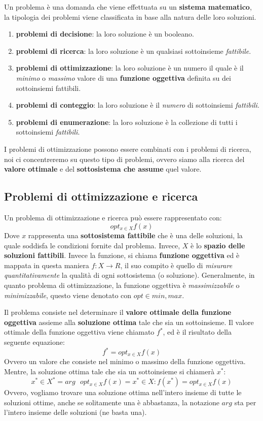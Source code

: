 \documentclass{article}
\begin{document}
Un problema è una domanda che viene effettuata su un \textbf{sistema matematico}, la tipologia dei problemi viene classificata in base alla natura delle loro soluzioni.
\begin{enumerate}
    \item \textbf{problemi di decisione}: la loro soluzione è un booleano.
    \item \textbf{problemi di ricerca}: la loro soluzione è un qualsiasi sottoinsieme \textit{fattibile}.
    \item \textbf{problemi di ottimizzazione}: la loro soluzione è un numero il quale è il \textit{minimo} o \textit{massimo} valore di una \textbf{funzione oggettiva}
          definita su dei sottoinsiemi fattibili.
    \item \textbf{problemi di conteggio}: la loro soluzione è il \textit{numero} di sottoinsiemi \textit{fattibili}.
    \item \textbf{problemi di enumerazione}: la loro soluzione è la collezione di tutti i sottoinsiemi \textit{fattibili}.
\end{enumerate}
I problemi di ottimizzazione possono essere combinati con i problemi di ricerca, noi ci concentreremo su questo tipo di problemi, ovvero siamo alla ricerca del
\textbf{valore ottimale} e del \textbf{sottosistema che assume} quel valore.

\subsection{Problemi di ottimizzazione e ricerca}

Un problema di ottimizzazione e ricerca può essere rappresentato con:
$$opt_{x\in X}f(x)$$
Dove $x$ rappresenta una \textbf{sottosistema fattibile} che è una delle soluzioni, la quale soddisfa le condizioni fornite dal problema. Invece, $X$
è lo \textbf{spazio delle soluzioni fattibili}. Invece la funzione, si chiama \textbf{funzione oggettiva} ed è mappata in questa maniera $f:X \rightarrow R$,
il suo compito è quello di \textit{misurare quantitativamente} la qualità di ogni sottosistema (o soluzione).
Generalmente, in quanto problema di ottimizzazione, la funzione oggettiva è \textit{massimizzabile} o \textit{minimizzabile}, questo viene denotato con $opt\in {min,max}$.

Il problema consiste nel determinare il \textbf{valore ottimale della funzione oggettiva} assieme alla \textbf{soluzione ottima} tale che sia un sottoinsieme. Il valore ottimale della funzione oggettiva viene chiamato $f^*$, ed è il risultato della seguente equazione:
$$f^*=opt_{x\in X}f(x)$$
Ovvero un valore che consiste nel minimo o massimo della funzione oggettiva. Mentre, la soluzione ottima tale che sia un sottoinsieme si chiamerà $x^*$:
$$x^*\in X^*=arg\textit{ } opt_{x\in X}f(x)={x^* \in X : f(x^*)=opt_{x\in X}f(x)}$$
Ovvero, vogliamo trovare una soluzione ottima nell'intero insieme di tutte le soluzioni ottime, anche se solitamente una è abbastanza, la notazione $arg$
sta per l'intero insieme delle soluzioni (ne basta una).
\end{document}
